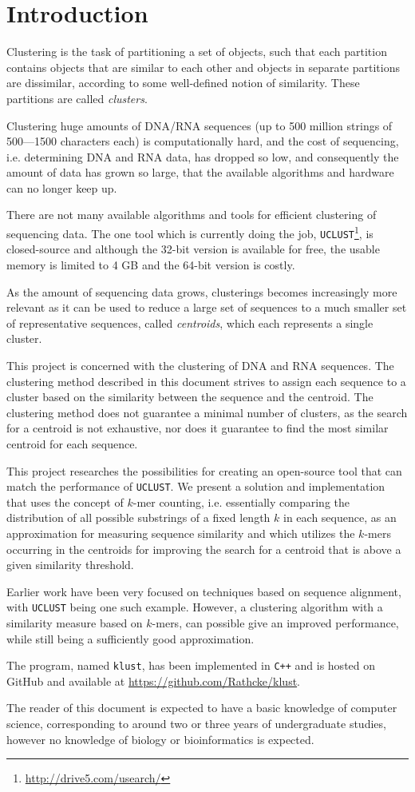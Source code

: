 \section{Introduction}

Clustering is the task of partitioning a set of objects, such that each
partition contains objects that are similar to each other and objects in
separate partitions are dissimilar, according to some well-defined notion of
similarity. These partitions are called \emph{clusters}.

Clustering huge amounts of DNA/RNA sequences (up to 500 million strings of
500—1500 characters each) is computationally hard, and the cost of sequencing,
i.e. determining DNA and RNA data, has dropped so low, and consequently the
amount of data has grown so large, that the available algorithms and hardware
can no longer keep up.~\cite{rothberg}

There are not many available algorithms and tools for efficient clustering of
sequencing data. The one tool which is currently doing the job,
\texttt{UCLUST}\footnote{\url{http://drive5.com/usearch/}}, is closed-source
and although the 32-bit version is available for free, the usable memory is
limited to 4 GB and the 64-bit version is costly.

As the amount of sequencing data grows, clusterings becomes increasingly more
relevant as it can be used to reduce a large set of sequences to a much smaller
set of representative sequences, called \emph{centroids}, which each represents
a single cluster.

This project is concerned with the clustering of DNA and RNA sequences. The
clustering method described in this document strives to assign each sequence to
a cluster based on the similarity between the sequence and the centroid. The
clustering method does not guarantee a minimal number of clusters, as the
search for a centroid is not exhaustive, nor does it guarantee to find the most
similar centroid for each sequence.

This project researches the possibilities for creating an open-source tool that
can match the performance of \texttt{UCLUST}. We present a solution and
implementation that uses the concept of $k$-mer counting, i.e. essentially
comparing the distribution of all possible substrings of a fixed length $k$ in
each sequence, as an approximation for measuring sequence similarity and which
utilizes the $k$-mers occurring in the centroids for improving the search for a
centroid that is above a given similarity threshold.

Earlier work have been very focused on techniques based on sequence alignment,
with \texttt{UCLUST} being one such example. However, a clustering algorithm
with a similarity measure based on $k$-mers, can possible give an improved
performance, while still being a sufficiently good approximation.

The program, named \texttt{klust}, has been implemented in \texttt{C++} and is
hosted on GitHub and available at \url{https://github.com/Rathcke/klust}.

The reader of this document is expected to have a basic knowledge of computer
science, corresponding to around two or three years of undergraduate studies,
however no knowledge of biology or bioinformatics is expected.
